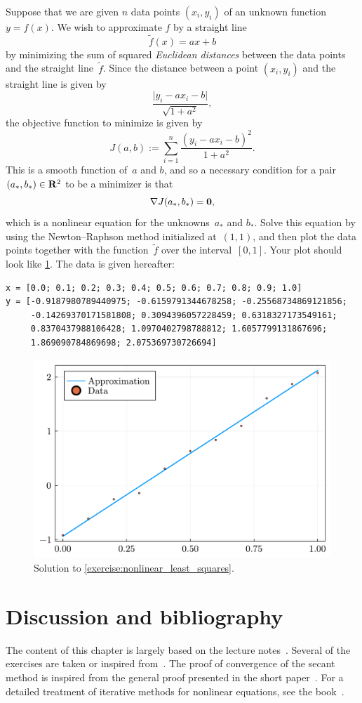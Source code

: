 \begin{exercise}
    \label{exercise:nonlinear_least_squares}
    Suppose that we are given $n$ data points $(x_i, y_i)$ of an unknown function~$y = f(x)$.
    We wish to approximate $f$ by a straight line
    \[
        \widetilde f(x) = ax + b
    \]
    by minimizing the sum of squared \emph{Euclidean distances} between the data points and the straight line~$\widetilde f$.
    Since the distance between a point $(x_i, y_i)$ and the straight line is given by
    \[
        \frac{\lvert y_i - a x_i - b \rvert}{\sqrt{1+a^2}},
    \]
    the objective function to minimize is given by
    \[
        J(a, b) := \sum_{i=1}^{n} \frac{ \left( y_i - a x_i - b \right)^2 }{1+a^2}.
    \]
    This is a smooth function of~$a$ and $b$,
    and so a necessary condition for a pair $(a_*, b_*) \in \mathbf R^2$ to be a minimizer is that
    \[
        \nabla J(a_*, b_*) = \mathbf{\boldsymbol{0}},
    \]
    which is a nonlinear equation for the unknowns~$a_*$ and $b_*$.
    Solve this equation by using the Newton--Raphson method initialized at~$(1, 1)$,
    and then plot the data points together with the function~$\widetilde f$ over the interval~$[0, 1]$.
    Your plot should look like \cref{fig:solution_exercise_approximation_least_squares}.
    The data is given hereafter:
    \begin{verbatim}
x = [0.0; 0.1; 0.2; 0.3; 0.4; 0.5; 0.6; 0.7; 0.8; 0.9; 1.0]
y = [-0.9187980789440975; -0.6159791344678258; -0.25568734869121856;
     -0.14269370171581808; 0.3094396057228459; 0.6318327173549161;
     0.8370437988106428; 1.0970402798788812; 1.6057799131867696;
     1.869090784869698; 2.075369730726694]
    \end{verbatim}
    \begin{figure}[ht]
        \centering
        \includegraphics[width=0.6\linewidth]{figures/approx_line.pdf}
        \caption{Solution to \cref{exercise:nonlinear_least_squares}.}%
        \label{fig:solution_exercise_approximation_least_squares}
    \end{figure}
\end{exercise}

\section{Discussion and bibliography}

The content of this chapter is largely based on the lecture notes~\cite{VanDooren}.
Several of the exercises are taken or inspired from~\cite{Legat}.
The proof of convergence of the secant method is inspired from the general proof presented in the short paper~\cite{MR1186462}.
For a detailed treatment of iterative methods for nonlinear equations,
see the book~\cite{MR1744713}.
